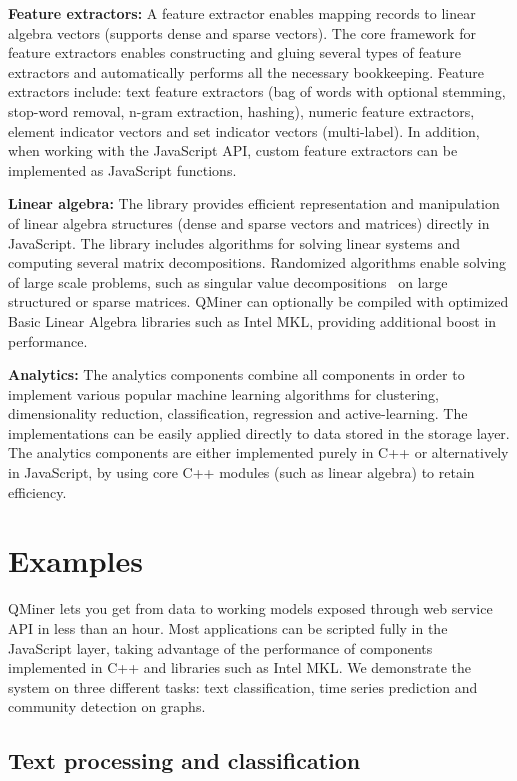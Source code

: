 \documentclass{article} %
\begin{document}
\textbf{Feature extractors:} A feature extractor enables mapping records to linear algebra vectors (supports dense and sparse vectors). The core framework for feature extractors enables constructing and gluing several types of feature extractors and automatically performs all the necessary bookkeeping. Feature extractors include: text feature extractors (bag of words with optional stemming, stop-word removal, n-gram extraction, hashing), numeric feature extractors, element indicator vectors and set indicator vectors (multi-label). In addition, when working with the JavaScript API, custom feature extractors can be implemented as JavaScript functions.

\textbf{Linear algebra:} The library provides efficient representation and manipulation of linear algebra structures (dense and sparse vectors and matrices) directly in JavaScript. The library includes algorithms for solving linear systems and computing several matrix decompositions. Randomized algorithms enable solving of large scale problems, such as singular value decompositions~\cite{tropp} on large structured or sparse matrices. QMiner can optionally be compiled with optimized Basic Linear Algebra libraries such as Intel MKL, providing additional boost in performance. 

\textbf{Analytics:} The analytics components combine all components in order to implement various popular machine learning algorithms for clustering, dimensionality reduction, classification, regression and active-learning. The implementations can be easily applied directly to data stored in the storage layer. The analytics components are either implemented purely in C++ or alternatively in JavaScript, by using core C++ modules (such as linear algebra) to retain efficiency.


\section{Examples}
\label{sec:examples}

QMiner lets you get from data to working models exposed through web service API in less than an hour. Most applications can be scripted fully in the JavaScript layer, taking advantage of the performance of components implemented in C++ and libraries such as Intel MKL. We demonstrate the system on three different tasks: text classification, time series prediction and community detection on graphs.

\subsection{Text processing and classification}
\end{document}
